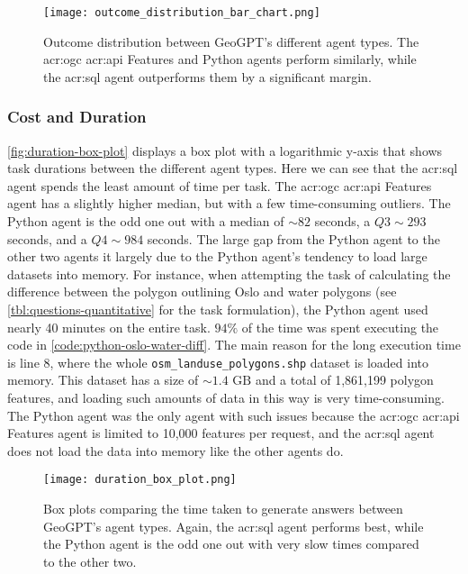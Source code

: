 \begin{figure}[htbp]
    \centering
    \texttt{[image: outcome\_distribution\_bar\_chart.png]}
    \caption[Outcome distribution between GeoGPT's different agent types]{Outcome distribution between GeoGPT's different agent types. The \acrshort{acr:ogc} \acrshort{acr:api} Features and Python agents perform similarly, while the \acrshort{acr:sql} agent outperforms them by a significant margin.}
    \label{fig:outcome-distribution}
\end{figure}

\subsubsection{Cost and Duration}

\autoref{fig:duration-box-plot} displays a box plot with a logarithmic y-axis that shows task durations between the different agent types. Here we can see that the \acrshort{acr:sql} agent spends the least amount of time per task. The \acrshort{acr:ogc} \acrshort{acr:api} Features agent has a slightly higher median, but with a few time-consuming outliers. The Python agent is the odd one out with a median of $\sim 82$ seconds, a $Q3 \sim 293$ seconds, and a $Q4 \sim 984$ seconds. The large gap from the Python agent to the other two agents it largely due to the Python agent's tendency to load large datasets into memory. For instance, when attempting the task of calculating the difference between the polygon outlining Oslo and water polygons (see \autoref{tbl:questions-quantitative} for the task formulation), the Python agent used nearly 40 minutes on the entire task. $94\%$ of the time was spent executing the code in \autoref{code:python-oslo-water-diff}. The main reason for the long execution time is line 8, where the whole \texttt{osm\_landuse\_polygons.shp} dataset is loaded into memory. This dataset has a size of $\sim 1.4 \text{ GB}$ and a total of 1,861,199 polygon features, and loading such amounts of data in this way is very time-consuming. The Python agent was the only agent with such issues because the \acrshort{acr:ogc} \acrshort{acr:api} Features agent is limited to 10,000 features per request, and the \acrshort{acr:sql} agent does not load the data into memory like the other agents do.

\begin{figure}[htbp]
    \centering
    \texttt{[image: duration\_box\_plot.png]}
    \caption[Box plots comparing the time taken to generate answers between GeoGPT's agent types]{Box plots comparing the time taken to generate answers between GeoGPT's agent types. Again, the \acrshort{acr:sql} agent performs best, while the Python agent is the odd one out with very slow times compared to the other two.}
    \label{fig:duration-box-plot}
\end{figure}

